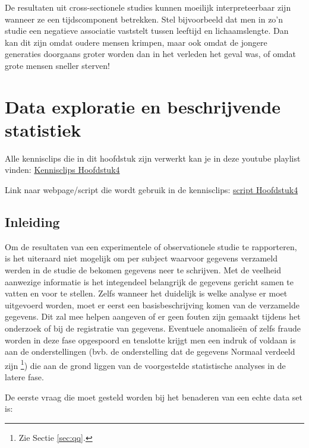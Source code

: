 \documentclass[
  12pt,dutch]{book}
\theoremstyle{definition}
\theoremstyle{definition}
\theoremstyle{definition}
\theoremstyle{definition}
\theoremstyle{remark}
\begin{document}
De resultaten uit cross-sectionele studies kunnen moeilijk interpreteerbaar zijn wanneer ze een tijdscomponent betrekken. Stel bijvoorbeeld dat men in zo'n studie een negatieve associatie
vaststelt tussen leeftijd en lichaamslengte. Dan kan dit zijn omdat oudere
mensen krimpen, maar ook omdat de jongere generaties doorgaans groter worden
dan in het verleden het geval was, of omdat grote mensen sneller sterven!

\chapter{Data exploratie en beschrijvende statistiek}\label{chap-describe}

Alle kennisclips die in dit hoofdstuk zijn verwerkt kan je in deze youtube playlist vinden: \href{https://www.youtube.com/watch?v=AVd-8WE_DhU&list=PLZH1hP8_LbJLKTeg_D9CHC3xbk0nfBa-1}{Kennisclips Hoofdstuk4}

Link naar webpage/script die wordt gebruik in de kennisclips: \href{https://statomics.github.io/sbc/rmd/04-dataExploration.html}{script Hoofdstuk4}

\section{Inleiding}\label{inleiding-3}

Om de resultaten van een experimentele of observationele studie te
rapporteren, is het uiteraard niet mogelijk om per subject waarvoor gegevens verzameld werden in de studie de bekomen gegevens neer te schrijven. Met
de veelheid aanwezige informatie is het integendeel belangrijk de gegevens
gericht samen te vatten en voor te stellen. Zelfs wanneer het duidelijk is welke analyse er moet uitgevoerd worden, moet er eerst een
basisbeschrijving komen van de verzamelde gegevens. Dit zal mee helpen
aangeven of er geen fouten zijn gemaakt tijdens het onderzoek of bij de
registratie van gegevens. Eventuele anomalieën of zelfs fraude worden in
deze fase opgespoord en tenslotte krijgt men een indruk of voldaan is aan de
onderstellingen (bvb. de onderstelling dat de gegevens Normaal verdeeld zijn
\footnote{Zie Sectie \ref{sec:qq}.}) die aan de grond liggen van de voorgestelde
statistische analyses in de latere fase.

De eerste vraag die moet gesteld worden bij het benaderen van een echte data
set is:
\end{document}
